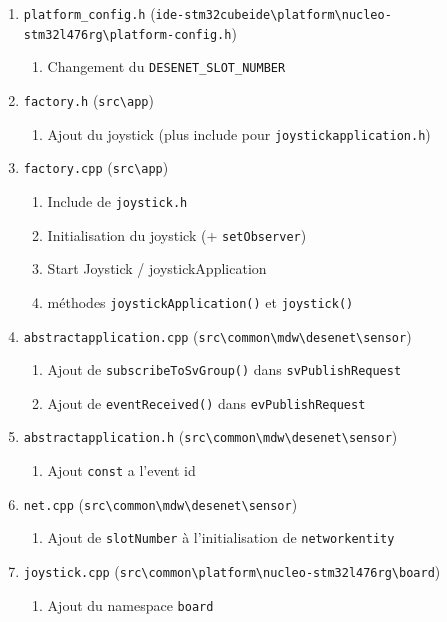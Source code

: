 \begin{enumerate}
\item \verb!platform_config.h! (\verb!ide-stm32cubeide\platform\nucleo-stm32l476rg\platform-config.h!)
\begin{enumerate}
  \item Changement du \verb!DESENET_SLOT_NUMBER!
\end{enumerate}
\item \verb!factory.h! (\verb!src\app!)
\begin{enumerate}
  \item Ajout du joystick (plus include pour \verb!joystickapplication.h!)
\end{enumerate}
\item \verb!factory.cpp! (\verb!src\app!)
\begin{enumerate}
  \item Include de \verb!joystick.h!
  \item Initialisation du joystick (+ \verb!setObserver!)
  \item Start Joystick / joystickApplication
  \item méthodes \verb!joystickApplication()! et \verb!joystick()!
\end{enumerate}
\item \verb!abstractapplication.cpp! (\verb!src\common\mdw\desenet\sensor!)
\begin{enumerate}
  \item Ajout de \verb!subscribeToSvGroup()! dans \verb!svPublishRequest!
  \item Ajout de \verb!eventReceived()! dans \verb!evPublishRequest!
\end{enumerate}
\item \verb!abstractapplication.h! (\verb!src\common\mdw\desenet\sensor!)
\begin{enumerate}
  \item Ajout \verb!const! a l'event id
\end{enumerate}
\item \verb!net.cpp! (\verb!src\common\mdw\desenet\sensor!)
\begin{enumerate}
  \item Ajout de \verb!slotNumber! à l'initialisation de \verb!networkentity!
\end{enumerate}
\item \verb!joystick.cpp! (\verb!src\common\platform\nucleo-stm32l476rg\board!)
\begin{enumerate}
  \item Ajout du namespace \verb!board!

\end{enumerate}
\end{enumerate}
